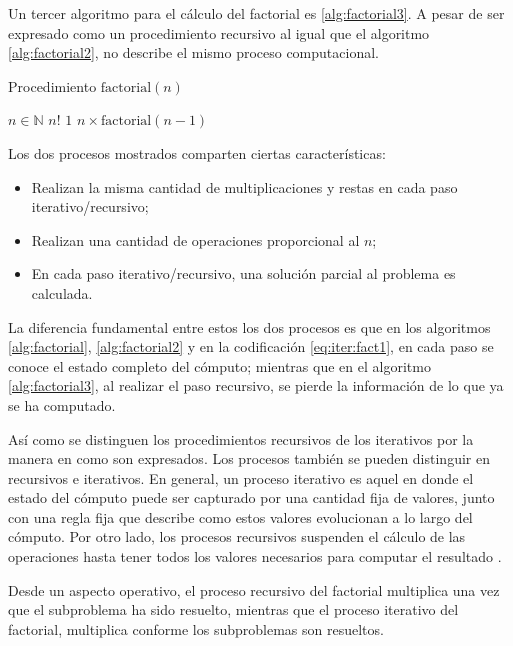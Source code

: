Un tercer algoritmo para el cálculo del factorial es \ref{alg:factorial3}. A pesar de ser expresado como un procedimiento recursivo al igual que el algoritmo \ref{alg:factorial2}, no describe el mismo proceso computacional.

\begin{algorithm}
  \caption{Procedimiento \( \mathrm{factorial}(n) \)}
  \label{alg:factorial3}
  \begin{algorithmic}
    \REQUIRE \( n\in \mathbb{N} \)
    \ENSURE \( n! \)
    \RETURN \( 1 \)
    \ELSE
    \RETURN \( n\times \mathrm{factorial}(n-1) \)
    \ENDIF
  \end{algorithmic}
\end{algorithm}

Los dos procesos mostrados comparten ciertas características:

\begin{itemize}
\item Realizan la misma cantidad de multiplicaciones y restas en cada paso iterativo/recursivo;
\item Realizan una cantidad de operaciones proporcional al \( n \);
\item En cada paso iterativo/recursivo, una solución parcial al problema es calculada.
\end{itemize}

La diferencia fundamental entre estos los dos procesos es que en los algoritmos \ref{alg:factorial}, \ref{alg:factorial2} y en la codificación \eqref{eq:iter:fact1}, en cada paso se conoce el estado completo del cómputo; mientras que en el algoritmo \ref{alg:factorial3}, al realizar el paso recursivo, se pierde la información de lo que ya se ha computado.

Así como se distinguen los procedimientos recursivos de los iterativos por la manera en como son expresados. Los procesos también se pueden distinguir en recursivos e iterativos. En general, un proceso iterativo es aquel en donde el estado del cómputo puede ser capturado por una cantidad fija de valores, junto con una regla fija que describe como estos valores evolucionan a lo largo del cómputo. Por otro lado, los procesos recursivos suspenden el cálculo de las operaciones hasta tener todos los valores necesarios para computar el resultado \cite{AbelsonSussman:Wizard}.

Desde un aspecto operativo, el proceso recursivo del factorial multiplica una vez que el subproblema ha sido resuelto, mientras que el proceso iterativo del factorial, multiplica conforme los subproblemas son resueltos.

